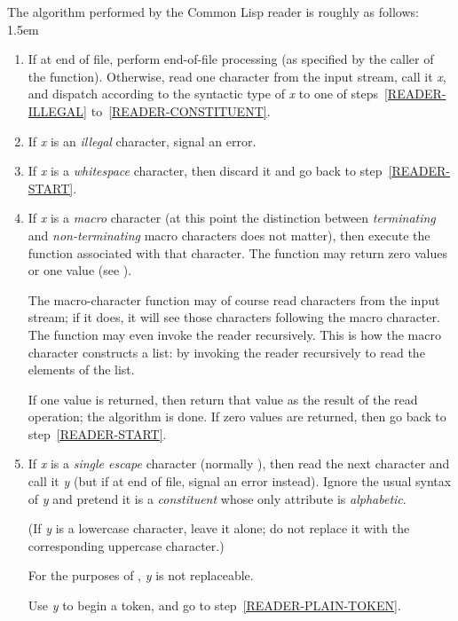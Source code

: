 The algorithm performed by the Common Lisp reader is roughly as follows:
\begingroup\leftmargini 1.5em
\begin{enumerate}
\item
If at end of file, perform end-of-file processing (as specified
by the caller of the  function).
Otherwise,
read one character from the input stream, call it {\it x}, and
dispatch according to the syntactic type of {\it x} to one
of steps~\ref{READER-ILLEGAL} to~\ref{READER-CONSTITUENT}.
\label{READER-START}

\item
If {\it x} is an {\it illegal} character, signal an error.
\label{READER-ILLEGAL}

\item
If {\it x} is a {\it whitespace} character,
then discard it and go back to step~\ref{READER-START}.
\label{READER-WHITESPACE}

\item
If {\it x} is a {\it macro} character (at this point the
distinction between {\it terminating} and {\it non-terminating} macro characters
does not matter), then execute the function associated
with that character.  The function may return zero values or one value
(see ).

The macro-character function may of course read characters from the input
stream; if it does, it will see those characters following the macro
character.  The function may even invoke the reader recursively.
This is how the macro character \cd{(} constructs a list:
by invoking the reader recursively to read the elements of the list.

If one value is returned, then return that value as the result of the
read operation; the algorithm is done.
If zero values are returned, then go back to step~\ref{READER-START}.

\item
If {\it x} is a {\it single escape} character (normally \cd{{\Xbackslash}}),
then read the next character and call it {\it y}
(but if at end of file, signal an error instead).
Ignore the usual syntax of {\it y}
and pretend it is a {\it constituent} whose only attribute is
{\it alphabetic}.
\begin{obsolete}
(If {\it y} is a lowercase character, leave it alone;
do not replace it with the corresponding uppercase character.)
\end{obsolete}
\begin{newer}
For the purposes of , {\it y} is not replaceable.
\end{newer}
Use {\it y} to begin a token, and go to step~\ref{READER-PLAIN-TOKEN}.


\end{enumerate}
